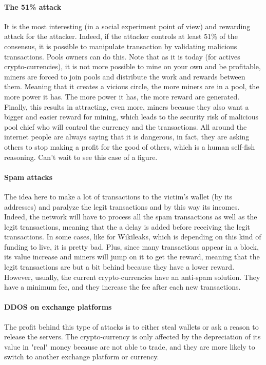 \paragraph{The 51\% attack}
It is the most interesting (in a social experiment point of view) and rewarding attack for the attacker. Indeed, if the attacker controls at least 51\% of the consensus, it is possible to manipulate transaction by validating malicious transactions. Pools owners can do this. Note that as it is today (for actives crypto-currencies), it is not more possible to mine on your own and be profitable, miners are forced to join pools and distribute the work and rewards between them. Meaning that it creates a vicious circle, the more miners are in a pool, the more power it has. The more power it has, the more reward are generated. Finally, this results in attracting, even more, miners because they also want a bigger and easier reward for mining, which leads to the security risk of malicious pool chief who will control the currency and the transactions. All around the internet people are always saying that it is dangerous, in fact, they are asking others to stop making a profit for the good of others, which is a human self-fish reasoning. Can't wait to see this case of a figure.

\paragraph{Spam attacks}
The idea here to make a lot of transactions to the victim's wallet (by its addresses) and paralyze the legit transactions and by this way its incomes. Indeed, the network will have to process all the spam transactions as well as the legit transactions, meaning that the a delay is added before receiving the legit transactions. In some cases, like for Wikileaks\cite{TheBitcoinNews2015BitcoinAttacks}, which is depending on this kind of funding to live, it is pretty bad. Plus, since many transactions appear in a block, its value increase and miners will jump on it to get the reward, meaning that the legit transactions are but a bit behind because they have a lower reward. However, usually, the current crypto-currencies have an anti-spam solution. They have a minimum fee, and they increase the fee after each new transactions.

\paragraph{DDOS on exchange platforms}
The profit behind this type of attacks is to either steal wallets or ask a reason to release the servers. The crypto-currency is only affected by the depreciation of its value in "real" money because are not able to trade, and they are more likely to switch to another exchange platform or currency.

